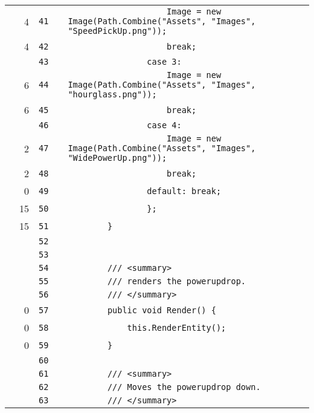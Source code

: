 \documentclass[a4paper,landscape,10pt]{article}
\begin{document}
\begin{longtable}[l]{lrrll}
\cellcolor{green} & 4 & \verb~41~ & & \verb~                    Image = new Image(Path.Combine("Assets", "Images", "SpeedPickUp.png"));~\\
\cellcolor{green} & 4 & \verb~42~ & & \verb~                    break;~\\
\cellcolor{gray} &  & \verb~43~ & & \verb~                case 3:~\\
\cellcolor{green} & 6 & \verb~44~ & & \verb~                    Image = new Image(Path.Combine("Assets", "Images", "hourglass.png"));~\\
\cellcolor{green} & 6 & \verb~45~ & & \verb~                    break;~\\
\cellcolor{gray} &  & \verb~46~ & & \verb~                case 4:~\\
\cellcolor{green} & 2 & \verb~47~ & & \verb~                    Image = new Image(Path.Combine("Assets", "Images", "WidePowerUp.png"));~\\
\cellcolor{green} & 2 & \verb~48~ & & \verb~                    break;~\\
\cellcolor{red} & 0 & \verb~49~ & & \verb~                default: break;~\\
\cellcolor{green} & 15 & \verb~50~ & & \verb~                };~\\
\cellcolor{green} & 15 & \verb~51~ & & \verb~        }~\\
\cellcolor{gray} &  & \verb~52~ & & \verb~~\\
\cellcolor{gray} &  & \verb~53~ & & \verb~~\\
\cellcolor{gray} &  & \verb~54~ & & \verb~        /// <summary>~\\
\cellcolor{gray} &  & \verb~55~ & & \verb~        /// renders the powerupdrop.~\\
\cellcolor{gray} &  & \verb~56~ & & \verb~        /// </summary>~\\
\cellcolor{red} & 0 & \verb~57~ & & \verb~        public void Render() {~\\
\cellcolor{red} & 0 & \verb~58~ & & \verb~            this.RenderEntity();~\\
\cellcolor{red} & 0 & \verb~59~ & & \verb~        }~\\
\cellcolor{gray} &  & \verb~60~ & & \verb~~\\
\cellcolor{gray} &  & \verb~61~ & & \verb~        /// <summary>~\\
\cellcolor{gray} &  & \verb~62~ & & \verb~        /// Moves the powerupdrop down.~\\
\cellcolor{gray} &  & \verb~63~ & & \verb~        /// </summary>~\\

\end{longtable}
\end{document}
